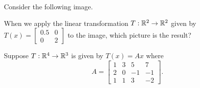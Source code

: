 

\edXsolution{ 

}

\endedxproblem



Consider the following image.  

\begin{center}
 
\end{center}

When we apply the linear transformation $T: \mathbb R^2 \rightarrow \mathbb R^2$ given by $T(x) = \left[ \begin{array}{cc}
0.5 & 0 \\ 0 & 2 \end{array} \right]$ to the image, which picture is the result?

\begin{center}
 

\end{center}






\edXsolution{ 

}

\endedxproblem




\endedxvertical











Suppose $T: \mathbb R^4\rightarrow \mathbb R^3$ is given by 
$T(x) = Ax$ where  
\[ A = \left[ \begin{array}{cccc} 1 & 3 & 5 & 7 \\ 2 & 0 & -1 & -1 \\ 1 & 1 & 3  & -2 \end{array} \right].\]

